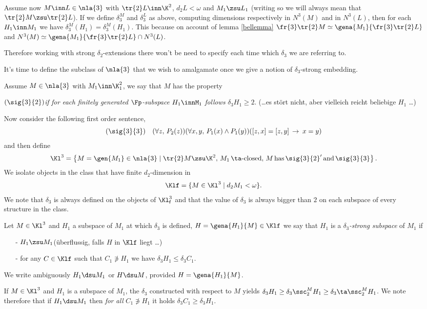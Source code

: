Assume now $M\inn L\in\nla{3}$ with $\tr{2}L\inn\K^{2}$, $d_{2}L<\omega$ and $M_{1}\zsu L_{1}$
(writing so we will always mean that $\tr{2}M\zsu\tr{2}L$).
If we define $\delta_{3}^{M}$ and $\delta_{3}^{L}$ as above, computing dimensions respectively
in $N^{3}(M)$ and in $N^{3}(L)$,
then for each $H_{1}\inn M_{1}$ we have $\delta_{3}^{M}(H_{1})=\delta_{3}^{M}(H_{1})$.
This because on account of lemma \ref{bellemma} $\fr{3}\tr{2}M\simeq\gena{M_{1}}{\fr{3}\tr{2}L}$ and
$N^{3}(M)\simeq\gena{M_{1}}{\fr{3}\tr{2}L}\cap N^{3}(L)$.

Therefore working with strong $\delta_{2}$-extensions there won't be need to specify
each time which $\delta_{3}$ we are referring to.

\medskip
It's time to define the subclass of $\nla{3}$ that we wish to amalgamate once we give
a notion of $\delta_{3}$-strong embedding.

Assume $M\in\nla{3}$ with $M_{1}\inn\K^{2}_{1}$, we say that $M$ has the
property %
\begin{flushleft}
$(\sig{3}{2}%
)$\quad\textsl{if for each finitely generated $\Fp$-subspace $H_{1}\inn%
M_{1}$ follows
$\delta_{3}H_{1}\geq2$}. (\dots es st\"ort nicht, aber vielleich reicht beliebige $H_{1}$ \dots)
\end{flushleft}

Now consider the following first order sentence,
$$(\sig{3}{3})\quad(\forall z,\,P_{2}(z))(\forall x,y,\,P_{1}(x)\wedge P_{1}(y))([z,x]=[z,y]\,\rightarrow
\:x=y)$$
and then define
$$\Kl^{3}=\left\{
M=\gen{M_{1}}\in\nla{3}\mid
\tr{2}M\zsu\K^{2},\,M_{1}\, \ta\text{-closed},\,M\,\text{has}
\,\sig{3}{2}^{\prime}\,\text{and}\,\sig{3}{3}
\right\}.$$
We isolate objects in the class that have finite $d_{2}$-dimension in
$$\Klf=\{M\in\Kl^{3}\mid d_{2}M_{1}<\omega\}.$$
We note that $\delta_{3}$ is always defined on the objects of $\Kl^{3}_\textsf{f}$ and
that the value of $\delta_{3}$ is always bigger than $2$ on each subspace of
every structure in the class.

\begin{dfn}
Let $M\in\Kl^{3}$ and $H_{1}$ a subspace of $M_{1}$ at which $\delta_{3}$ is defined, $H=\gena{H_{1}}{M}\in\Klf$ %
we say that $H_{1}$ is a \emph{$\delta_{3}$-strong
subspace} of $M_{1}$ if 
\begin{itemize}
\item[-]$H_{1}\zsu M_{1}$\quad(\"uberflussig, falls $H$ in $\Klf$ liegt \dots)
\item[-]for any $C\in\Klf$ such that $C_{1}\nni H_{1}$ we have $\delta_{3}H_{1}\leq\delta_{3}C_{1}$.
\end{itemize}
We write ambiguously $H_{1}\dsu M_{1}$ or $H\dsu M$, provided $H=\gena{H_{1}}{M}$.
\end{dfn}
If $M\in\Kl^{3}$ and $H_{1}$ is a subspace of  $M_{1}$, the $\delta_{3}$ constructed
with respect to $M$ yields $\delta_{3}H_{1}\geq\delta_{3}\ssc^{M}_{2}H_{1}\geq\delta_{3}\ta\ssc_{2}^{M}H_{1}$. We note therefore that if $H_{1}\dsu M_{1}$ then \emph{for all} $C_{1}\nni H_{1}$ it holds
$\delta_{3}C_{1}\geq\delta_{3}H_{1}$.

